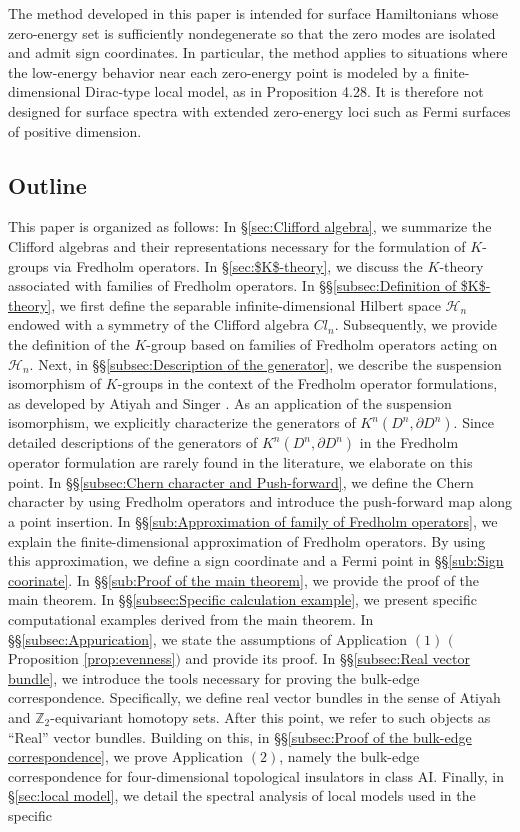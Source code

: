 \documentclass{amsart}
\theoremstyle{definition}
\theoremstyle{remark}
\begin{document}
The method developed in this paper is intended for surface Hamiltonians whose zero-energy set is sufficiently nondegenerate so that the zero modes are isolated and admit sign coordinates. In particular, the method applies to situations where the low-energy behavior near each zero-energy point is modeled by a finite-dimensional Dirac-type local model, as in Proposition 4.28. It is therefore not designed for surface spectra with extended zero-energy loci such as Fermi surfaces of positive dimension.

\subsection{Outline}

This paper is organized as follows: In \S \ref{sec:Clifford algebra}, we summarize the Clifford algebras and their representations necessary for the formulation of $K$-groups via Fredholm operators. In \S \ref{sec:$K$-theory}, we discuss the $K$-theory associated with families of Fredholm operators. In \S\S\ref{subsec:Definition of $K$-theory}, we first define the separable infinite-dimensional Hilbert space $\mathcal{H}_n$ endowed with a symmetry of the Clifford algebra $Cl_n$. Subsequently, we provide the definition of the $K$-group based on families of Fredholm operators acting on $\mathcal{H}_n$. Next, in \S\S \ref{subsec:Description of the generator}, we describe the suspension isomorphism of $K$-groups in the context of the Fredholm operator formulations, as developed by Atiyah and Singer \cite{A-Si}. As an application of the suspension isomorphism, we explicitly characterize the generators of $K^n(D^n, \partial D^n)$. Since detailed descriptions of the generators of $K^n(D^n, \partial D^n)$ in the Fredholm operator formulation are rarely found in the literature, we elaborate on this point. In \S\S \ref{subsec:Chern character and Push-forward}, we define the Chern character by using Fredholm operators and introduce the push-forward map along a point insertion. In \S\S\ref{sub:Approximation of family of Fredholm operators}, we explain the finite-dimensional approximation of Fredholm operators. By using this approximation, we define a sign coordinate and a Fermi point in \S\S \ref{sub:Sign coorinate}. In \S\S \ref{sub:Proof of the main theorem}, we provide the proof of the main theorem. In \S\S \ref{subsec:Specific calculation example}, we present specific computational examples derived from the main theorem. In \S\S \ref{subsec:Appurication}, we state the assumptions of Application $(1)$ $($Proposition \ref{prop:evenness}$)$ and provide its proof. In \S\S \ref{subsec:Real vector bundle}, we introduce the tools necessary for proving the bulk-edge correspondence. Specifically, we define real vector bundles in the sense of Atiyah and $\mathbb{Z}_2$-equivariant homotopy sets. After this point, we refer to such objects as “Real” vector bundles. Building on this, in \S\S \ref{subsec:Proof of the bulk-edge correspondence}, we prove Application $(2)$, namely the bulk-edge correspondence for four-dimensional topological insulators in class AI. Finally, in \S \ref{sec:local model}, we detail the spectral analysis of local models used in the specific 
\end{document}
